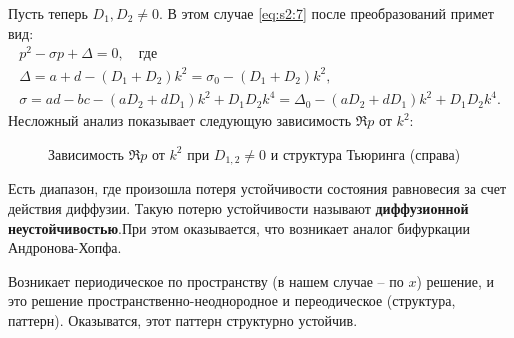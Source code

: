 Пусть теперь $D_1, D_2 \neq 0$. В этом случае \eqref{eq:s2:7} после преобразований примет вид:
\begin{gather*}
	p^2-\sigma p+\Delta=0, \quad \text{где}\\
	\Delta=a+d-(D_1+D_2)k^2=\sigma_0-(D_1+D_2)k^2, \\ \sigma=ad-bc-(aD_2+dD_1)k^2+D_1D_2k^4=\Delta_0-(aD_2+dD_1)k^2+D_1D_2k^4.
\end{gather*}
Несложный анализ показывает следующую зависимость $\Re p$  от $k^2$:
\begin{figure}[h]
\begin{minipage}[h]{0.49\linewidth}
\end{minipage}
\hfill
\begin{minipage}[h]{0.49\linewidth}
\end{minipage}
	\caption{Зависимость $\Re p$ от $k^2$ при $D_{1,2}\ne0$ и структура Тьюринга (справа)}
\end{figure}

Есть диапазон, где произошла потеря устойчивости состояния равновесия за счет действия диффузии. Такую потерю устойчивости называют \textbf{диффузионной неустойчивостью}.При этом оказывается, что возникает аналог бифуркации Андронова-Хопфа. 

Возникает периодическое по пространству (в нашем случае -- по $x$) решение, и это решение пространственно-неоднородное и переодическое (структура, паттерн). Оказыватся, этот паттерн структурно устойчив.

